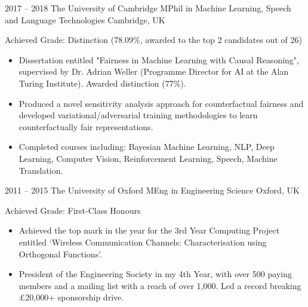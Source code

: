 \documentclass[]{friggeri-cv} %
\begin{document}
\begin{entrylist}


\entry
{2017 -- 2018}
{The University of Cambridge}
{MPhil {\normalfont in Machine Learning, Speech and Language Technologies }}
{Cambridge, UK}
{Achieved Grade: Distinction (78.09\%, awarded to the top 2 candidates out of 26)
	\begin{itemize}
        \item Dissertation entitled "Fairness in Machine Learning with Causal Reasoning", supervised by Dr. Adrian Weller (Programme Director for AI at the Alan Turing Institute). Awarded distinction (77\%).
        \item Produced a novel sensitivity analysis approach for counterfactual fairness and developed variational/adversarial training methodologies to learn counterfactually fair representations.
        \item Completed courses including: Bayesian Machine Learning, NLP, Deep Learning, Computer Vision, Reinforcement Learning, Speech, Machine Translation.
	\end{itemize}}



\entry
{2011 -- 2015}
{The University of Oxford}
{MEng {\normalfont in Engineering Science}}
{Oxford, UK}
{Achieved Grade: First-Class Honours
	\begin{itemize}
		\item Achieved the top mark in the year for the 3rd Year Computing Project entitled `Wireless Communication Channels: Characterisation using Orthogonal Functions'.
		\item President of the Engineering Society in my 4th Year, with over 500 paying members and a mailing list with a reach of over 1,000. Led a record breaking £20,000+ sponsorship drive.
	\end{itemize}}


\end{entrylist}
\end{document}
